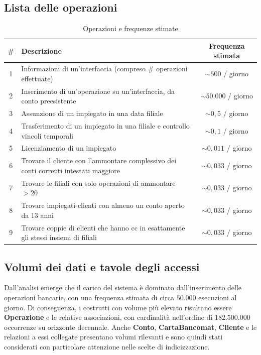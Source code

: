 \subsection{Lista delle operazioni}

\begin{table}[H]
  \centering
  \begin{tabular}{|c|p{9cm}|c|}
    \hline
    \# & Descrizione & Frequenza stimata \\
    \hline
    1 & Informazioni di un'interfaccia (compreso \# operazioni effettuate) & $\sim 500$ / giorno \\
    \hline
    2 & Inserimento di un'operazione su un'interfaccia, da conto preesistente & $\sim 50{.}000$ / giorno \\
    \hline
    3 & Assunzione di un impiegato in una data filiale & $\sim 0{,}5$ / giorno \\
    \hline
    4 & Trasferimento di un impiegato in una filiale e controllo vincoli temporali & $\sim 0{,}1$ / giorno \\
    \hline
    5 & Licenziamento di un impiegato & $\sim 0{,}011$ / giorno \\
    \hline
    6 & Trovare il cliente con l'ammontare complessivo dei conti correnti intestati maggiore & $\sim 0{,}033$ / giorno \\
    \hline
    7 & Trovare le filiali con solo operazioni di ammontare $> 20$ & $\sim 0{,}033$ / giorno \\
    \hline
    8 & Trovare impiegati-clienti con almeno un conto aperto da 13 anni & $\sim 0{,}033$ / giorno \\
    \hline
    9 & Trovare coppie di clienti che hanno cc in esattamente gli stessi insiemi di filiali & $\sim 0{,}033$ / giorno \\
    \hline
  \end{tabular}
  \caption{Operazioni e frequenze stimate}
\end{table}

\subsection{Volumi dei dati e tavole degli accessi}

Dall'analisi emerge che il carico del sistema è dominato dall'inserimento delle operazioni bancarie, con una frequenza stimata di circa \(50{.}000\) esecuzioni al giorno. Di conseguenza, i costrutti con volume più elevato risultano essere \textbf{Operazione} e le relative associazioni, con cardinalità nell'ordine di \(182{.}500{.}000\) occorrenze su orizzonte decennale. Anche \textbf{Conto}, \textbf{CartaBancomat}, \textbf{Cliente} e le relazioni a essi collegate presentano volumi rilevanti e sono quindi stati considerati con particolare attenzione nelle scelte di indicizzazione.


